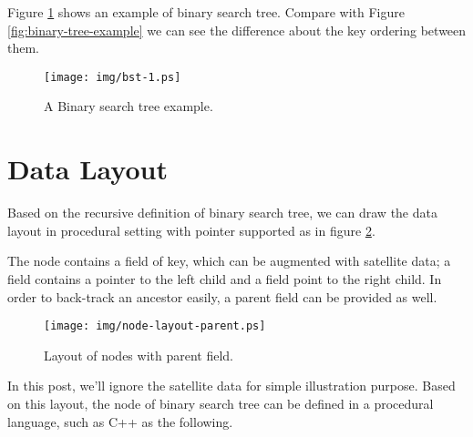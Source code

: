 \documentclass{article}
\begin{document}
Figure \ref{fig:bst-example} shows an example of binary search tree. Compare with
Figure \ref{fig:binary-tree-example} we can see the difference about the key 
ordering between them.

\begin{figure}[htbp]
       \begin{center}
        \texttt{[image: img/bst-1.ps]}
        \caption{A Binary search tree example.} \label{fig:bst-example}
       \end{center}
\end{figure}


\section{Data Layout}

Based on the recursive definition of binary search tree, we can draw the 
data layout in procedural setting with pointer supported as in figure
\ref{fig:node-layout-parent}.


The node contains a field of key, which can be augmented with satellite
data; a field contains a pointer to the left child and a field point to
the right child. In order to back-track an ancestor easily, a parent
field can be provided as well. 

\begin{figure}[htbp]
       \begin{center}
        \texttt{[image: img/node-layout-parent.ps]}
        \caption{Layout of nodes with parent field.} \label{fig:node-layout-parent}
       \end{center}
\end{figure}

In this post, we'll ignore the satellite data for simple illustration purpose.
Based on this layout, the node of binary search tree can be defined in a procedural
language, such as C++ as the following.
\end{document}
